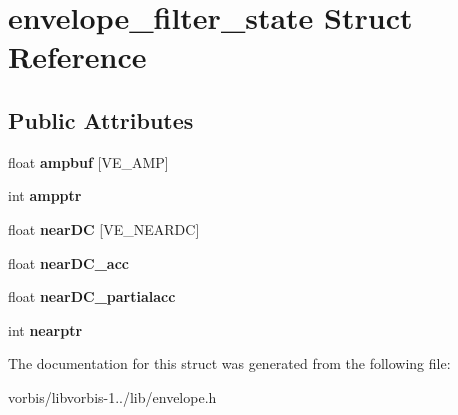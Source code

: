 \hypertarget{structenvelope__filter__state}{\section{envelope\+\_\+filter\+\_\+state Struct Reference}
\label{structenvelope__filter__state}
}
\subsection*{Public Attributes}
\begin{DoxyCompactItemize}
\item 
\hypertarget{structenvelope__filter__state_a4bf3a0979f375ef318ec15477ac4d982}{float {\bfseries ampbuf} \mbox{[}V\+E\+\_\+\+A\+M\+P\mbox{]}}\label{structenvelope__filter__state_a4bf3a0979f375ef318ec15477ac4d982}

\item 
\hypertarget{structenvelope__filter__state_accc7e4241fa4ad6220aaa1649ebc4f89}{int {\bfseries ampptr}}\label{structenvelope__filter__state_accc7e4241fa4ad6220aaa1649ebc4f89}

\item 
\hypertarget{structenvelope__filter__state_a58e86653a9251bbd8fb5bd2e6f0425c7}{float {\bfseries near\+D\+C} \mbox{[}V\+E\+\_\+\+N\+E\+A\+R\+D\+C\mbox{]}}\label{structenvelope__filter__state_a58e86653a9251bbd8fb5bd2e6f0425c7}

\item 
\hypertarget{structenvelope__filter__state_ab8f2411712c79252e710896dc9ef4cb8}{float {\bfseries near\+D\+C\+\_\+acc}}\label{structenvelope__filter__state_ab8f2411712c79252e710896dc9ef4cb8}

\item 
\hypertarget{structenvelope__filter__state_a4a0afe63b73ff77a8486aa1385a617de}{float {\bfseries near\+D\+C\+\_\+partialacc}}\label{structenvelope__filter__state_a4a0afe63b73ff77a8486aa1385a617de}

\item 
\hypertarget{structenvelope__filter__state_ac0f52e7fd7930f3ed8b72c7d27aef47f}{int {\bfseries nearptr}}\label{structenvelope__filter__state_ac0f52e7fd7930f3ed8b72c7d27aef47f}

\end{DoxyCompactItemize}


The documentation for this struct was generated from the following file\+:\begin{DoxyCompactItemize}
\item 
vorbis/libvorbis-\/1../lib/envelope.\+h\end{DoxyCompactItemize}
